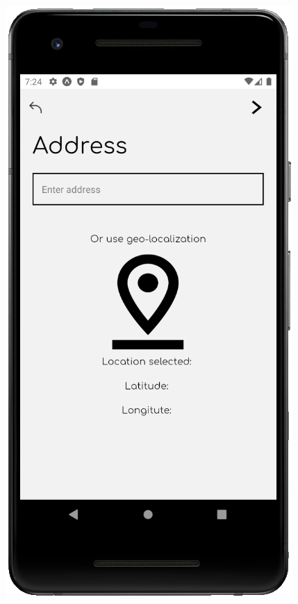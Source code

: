 \documentclass[10pt]{article}
\begin{document}
    \clearpage
    \begin{figure}[h]
     \centering
     \begin{minipage}[h]{0.4\textwidth}
         \centering
         \includegraphics[width=\textwidth]{resources/screens/AddPlant3.PNG}

\end{minipage}
\end{figure}
\end{document}

